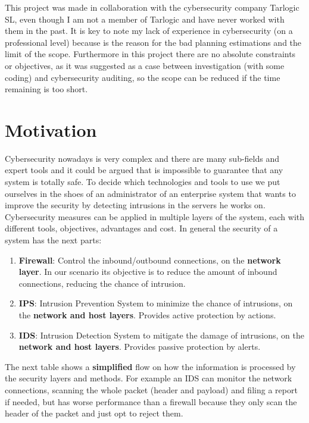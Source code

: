 


This project was made in collaboration with the cybersecurity company Tarlogic SL, even though I am not a member of Tarlogic and have never worked with them in the past. It is key to note my lack of experience in cybersecurity (on a professional level) because is the reason for the bad planning estimations and the limit of the scope. Furthermore in this project there are no absolute constraints or objectives, as it was suggested as a case between investigation (with some coding) and cybersecurity auditing, so the scope can be reduced if the time remaining is too short.

\section{Motivation}

Cybersecurity nowadays is very complex and there are many sub-fields and expert tools and it could be argued that is impossible to guarantee that any system is totally safe. To decide which technologies and tools to use we put ourselves in the shoes of an administrator of an enterprise system that wants to improve the security by detecting intrusions in the servers he works on.
\linej
\linej
Cybersecurity measures can be applied in multiple layers of the system, each with different tools, objectives, advantages and cost. In general the security of a system has the next parts:
\begin{enumerate}
	\item \textbf{Firewall}: Control the inbound/outbound connections, on the \textbf{network layer}. In our scenario its objective is to reduce the amount of inbound connections, reducing the chance of intrusion.
	\item \textbf{IPS}: Intrusion Prevention System to minimize the chance of intrusions, on the \textbf{network and host layers}. Provides active protection by actions.
	\item \textbf{IDS}: Intrusion Detection System to mitigate the damage of intrusions, on the \textbf{network and host layers}. Provides passive protection by alerts.
\end{enumerate}

\linej
The next table shows a \textbf{simplified} flow on how the information is processed by the security layers and methods. For example an IDS can monitor the network connections, scanning the whole packet (header and payload) and filing a report if needed, but has worse performance than a firewall because they only scan the header of the packet and just opt to reject them\cite{firewall-ipds-ids_comparison}.

